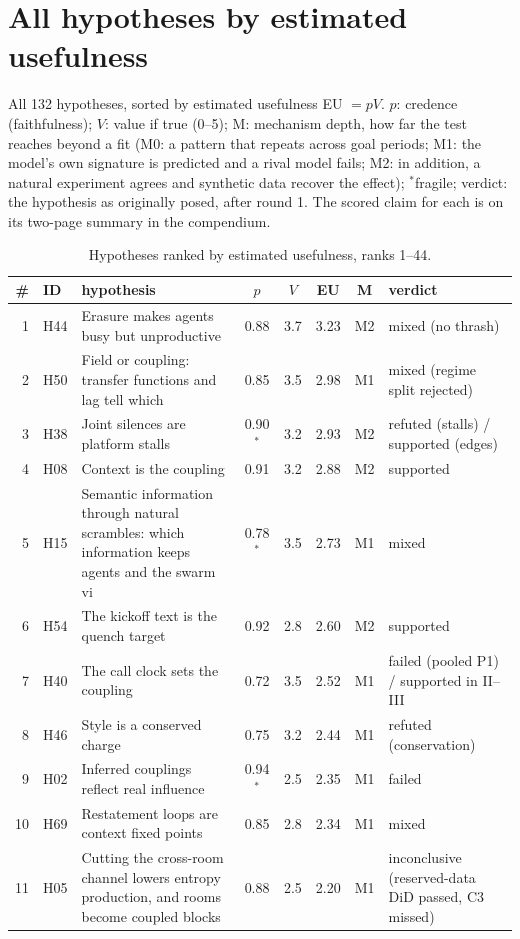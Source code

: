 \section{All hypotheses by estimated usefulness}\label{app:eu}
All 132 hypotheses, sorted by estimated usefulness EU $=pV$. $p$: credence (faithfulness); $V$: value if true (0--5); M: mechanism depth, how far the test reaches beyond a fit (M0: a pattern that repeats across goal periods; M1: the model's own signature is predicted and a rival model fails; M2: in addition, a natural experiment agrees and synthetic data recover the effect); $^\ast$fragile; verdict: the hypothesis as originally posed, after round 1. The scored claim for each is on its two-page summary in the compendium.
\begin{table}[p]
\caption{Hypotheses ranked by estimated usefulness, ranks 1--44.}
\label{tab:eu}
\scriptsize\renewcommand{\arraystretch}{0.95}
\begin{tabular}{@{}r l p{} c c c c l@{}}
\toprule \# & ID & hypothesis & $p$ & $V$ & EU & M & verdict\\ \midrule
1 & H44 & Erasure makes agents busy but unproductive & 0.88 & 3.7 & 3.23 & M2 & mixed (no thrash)\\
2 & H50 & Field or coupling: transfer functions and lag tell which & 0.85 & 3.5 & 2.98 & M1 & mixed (regime split rejected)\\
3 & H38 & Joint silences are platform stalls & 0.90$^\ast$ & 3.2 & 2.93 & M2 & refuted (stalls) / supported (edges)\\
4 & H08 & Context is the coupling & 0.91 & 3.2 & 2.88 & M2 & supported\\
5 & H15 & Semantic information through natural scrambles: which information keeps agents and the swarm vi & 0.78$^\ast$ & 3.5 & 2.73 & M1 & mixed\\
6 & H54 & The kickoff text is the quench target & 0.92 & 2.8 & 2.60 & M2 & supported\\
7 & H40 & The call clock sets the coupling & 0.72 & 3.5 & 2.52 & M1 & failed (pooled P1) / supported in II--III\\
8 & H46 & Style is a conserved charge & 0.75 & 3.2 & 2.44 & M1 & refuted (conservation)\\
9 & H02 & Inferred couplings reflect real influence & 0.94$^\ast$ & 2.5 & 2.35 & M1 & failed\\
10 & H69 & Restatement loops are context fixed points & 0.85 & 2.8 & 2.34 & M1 & mixed\\
11 & H05 & Cutting the cross-room channel lowers entropy production, and rooms become coupled blocks & 0.88 & 2.5 & 2.20 & M1 & inconclusive (reserved-data DiD passed, C3 missed)\\

\end{tabular}
\end{table}
